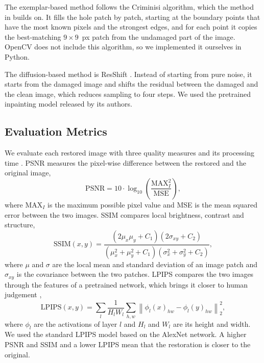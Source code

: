 \documentclass[conference]{IEEEtran}
\begin{document}
The exemplar-based method follows the Criminisi algorithm, which the method in \cite{xie2022} builds on. It fills the hole patch by patch, starting at the boundary points that have the most known pixels and the strongest edges, and for each point it copies the best-matching $9 \times 9$~px patch from the undamaged part of the image. OpenCV does not include this algorithm, so we implemented it ourselves in Python.

The diffusion-based method is ResShift \cite{yue2025}. Instead of starting from pure noise, it starts from the damaged image and shifts the residual between the damaged and the clean image, which reduces sampling to four steps. We used the pretrained inpainting model released by its authors.

\subsection*{Evaluation Metrics}

We evaluate each restored image with three quality measures and its processing time \cite{yang2024}. PSNR measures the pixel-wise difference between the restored and the original image,
\begin{equation}
  \mathrm{PSNR} = 10 \cdot \log_{10}\left(\frac{\mathrm{MAX}_I^2}{\mathrm{MSE}}\right),
  \label{eq:psnr}
\end{equation}
where $\mathrm{MAX}_I$ is the maximum possible pixel value and MSE is the mean squared error between the two images. SSIM compares local brightness, contrast and structure,
\begin{equation}
  \mathrm{SSIM}(x,y) = \frac{(2\mu_x\mu_y + C_1)(2\sigma_{xy} + C_2)}{(\mu_x^2 + \mu_y^2 + C_1)(\sigma_x^2 + \sigma_y^2 + C_2)},
  \label{eq:ssim}
\end{equation}
where $\mu$ and $\sigma$ are the local mean and standard deviation of an image patch and $\sigma_{xy}$ is the covariance between the two patches. LPIPS compares the two images through the features of a pretrained network, which brings it closer to human judgement \cite{yang2024},
\begin{equation}
  \mathrm{LPIPS}(x,y) = \sum_{l} \frac{1}{H_l W_l} \sum_{h,w} \left\lVert \phi_l(x)_{hw} - \phi_l(y)_{hw} \right\rVert_2^2,
  \label{eq:lpips}
\end{equation}
where $\phi_l$ are the activations of layer $l$ and $H_l$ and $W_l$ are its height and width. We used the standard LPIPS model based on the AlexNet network. A higher PSNR and SSIM and a lower LPIPS mean that the restoration is closer to the original.
\end{document}
